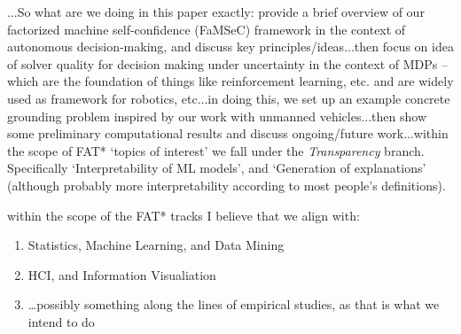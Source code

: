 ...So what are we doing in this paper exactly: provide a brief overview of our factorized machine self-confidence (FaMSeC) framework in the context of autonomous decision-making, and discuss key principles/ideas...then focus on idea of solver quality for decision making under uncertainty in the context of MDPs -- which are the foundation of things like reinforcement learning, etc. and are widely used as framework for robotics, etc...in doing this, we set up an example concrete grounding problem inspired by our work with unmanned vehicles...then show some preliminary computational results and discuss ongoing/future work...within the scope of FAT* `topics of interest' we fall under the \emph{Transparency} branch. Specifically `Interpretability of ML models', and `Generation of explanations' (although probably more interpretability according to most people's definitions).

within the scope of the FAT* tracks I believe that we align with:
\begin{enumerate}
    \item Statistics, Machine Learning, and Data Mining
    \item HCI, and Information Visualiation
    \item \ldots possibly something along the lines of empirical studies, as that is what we intend to do
\end{enumerate}



